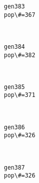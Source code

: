 \documentclass[11pt]{article}
\begin{document}
    \begin{Verbatim}[commandchars=\\\{\}]
gen383
pop\#=367

    \end{Verbatim}

    \begin{center}
    \end{center}
    { \hspace*{\fill} \\}
    
    \begin{Verbatim}[commandchars=\\\{\}]
gen384
pop\#=382

    \end{Verbatim}

    \begin{center}
    \end{center}
    { \hspace*{\fill} \\}
    
    \begin{Verbatim}[commandchars=\\\{\}]
gen385
pop\#=371

    \end{Verbatim}

    \begin{center}
    \end{center}
    { \hspace*{\fill} \\}
    
    \begin{Verbatim}[commandchars=\\\{\}]
gen386
pop\#=326

    \end{Verbatim}

    \begin{center}
    \end{center}
    { \hspace*{\fill} \\}
    
    \begin{Verbatim}[commandchars=\\\{\}]
gen387
pop\#=326

    \end{Verbatim}
\end{document}
